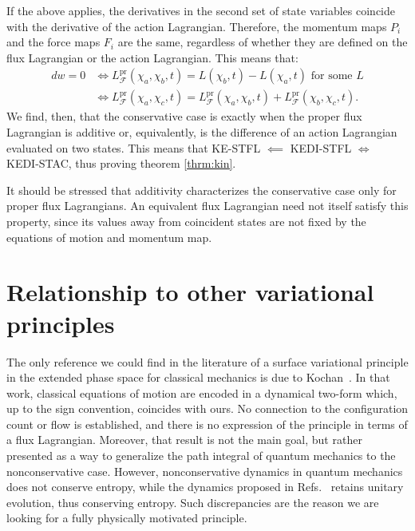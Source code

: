 \documentclass[nofootinbib,aps,pre]{revtex4-2}
\begin{document}
If the above applies, the derivatives in the second set of state variables coincide with the derivative of the action Lagrangian. Therefore, the momentum maps $P_i$ and the force maps $F_i$ are the same, regardless of whether they are defined on the flux Lagrangian or the action Lagrangian. This means that:
\begin{equation}
	\begin{aligned}
		dw=0
		&\iff
		L_{\mathcal{F}}^{\mathrm{pr}}(\chi_a,\chi_b,t)=L(\chi_b,t)-L(\chi_a,t)
		\text{ for some }L\\
		&\iff
		L_{\mathcal{F}}^{\mathrm{pr}}(\chi_a,\chi_c,t)
		=
		L_{\mathcal{F}}^{\mathrm{pr}}(\chi_a,\chi_b,t)
		+
		L_{\mathcal{F}}^{\mathrm{pr}}(\chi_b,\chi_c,t).
	\end{aligned}
\end{equation}
We find, then, that the conservative case is exactly when the proper flux Lagrangian is additive or, equivalently, is the difference of an action Lagrangian evaluated on two states. This means that KE-STFL $\impliedby$ KEDI-STFL $\iff$ KEDI-STAC, thus proving theorem \ref{thrm:kin}.

It should be stressed that additivity characterizes the conservative case only for proper flux Lagrangians. An equivalent flux Lagrangian need not itself satisfy this property, since its values away from coincident states are not fixed by the equations of motion and momentum map.

\section{Relationship to other variational principles}
\label{sec:othervarprinc}

The only reference we could find in the literature of a surface variational principle in the extended phase space for classical mechanics is due to Kochan~\cite{kochanstrings,kochan}. In that work, classical equations of motion are encoded in a dynamical two-form which, up to the sign convention, coincides with ours. No connection to the configuration count or flow is established, and there is no expression of the principle in terms of a flux Lagrangian. Moreover, that result is not the main goal, but rather presented as a way to generalize the path integral of quantum mechanics to the nonconservative case. However, nonconservative dynamics in quantum mechanics does not conserve entropy, while the dynamics proposed in Refs.~\cite{kochanstrings,kochan} retains unitary evolution, thus conserving entropy. Such discrepancies are the reason we are looking for a fully physically motivated principle.
\end{document}
